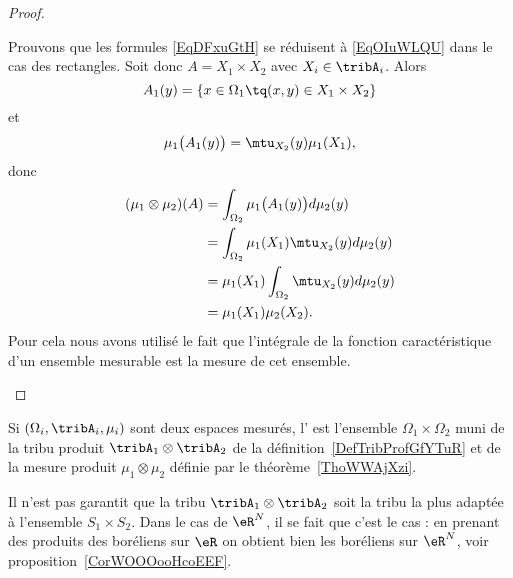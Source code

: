 \begin{proof}
\begin{subproof}
		Prouvons que les formules \eqref{EqDFxuGtH} se réduisent à \eqref{EqOIuWLQU} dans le cas des rectangles. Soit donc \( A=X_1\times X_2\) avec \( X_i\in\tribA_i\). Alors
		\begin{equation}
			A_1(y)=\{ x\in\Omega_1\tq (x,y)\in X_1\times X_2 \}
		\end{equation}
		et
		\begin{equation}
			\mu_1\big( A_1(y) \big)=\mtu_{X_2}(y)\mu_1(X_1),
		\end{equation}
		donc
		\begin{subequations}
			\begin{align}
				(\mu_1\otimes\mu_2)(A) & =\int_{\Omega_2}\mu_1\big( A_1(y) \big)d\mu_2(y) \\
				                       & =\int_{\Omega_2}\mu_1(X_1)\mtu_{X_2}(y)d\mu_2(y) \\
				                       & =\mu_1(X_1)\int_{\Omega_2}\mtu_{X_2}(y)d\mu_2(y) \\
				                       & =\mu_1(X_1)\mu_2(X_2).
			\end{align}
		\end{subequations}
		Pour cela nous avons utilisé le fait que l'intégrale de la fonction caractéristique d'un ensemble mesurable est la mesure de cet ensemble.
	\end{subproof}
\end{proof}

\begin{definition}  \label{DefUMlBCAO}
	Si \( (\Omega_i,\tribA_i,\mu_i)\) sont deux espaces mesurés, l' est l'ensemble \( \Omega_1\times \Omega_2\) muni de la tribu produit \( \tribA_1\otimes \tribA_2\) de la définition~\ref{DefTribProfGfYTuR} et de la mesure produit \( \mu_1\otimes \mu_2\) définie par le théorème~\ref{ThoWWAjXzi}.
\end{definition}

\begin{remark}
	Il n'est pas garantit que la tribu \( \tribA_1\otimes\tribA_2\) soit la tribu la plus adaptée à l'ensemble \( S_1\times S_2\). Dans le cas de \( \eR^N\), il se fait que c'est le cas : en prenant des produits des boréliens sur \( \eR\) on obtient bien les boréliens sur \( \eR^N\), voir proposition~\ref{CorWOOOooHcoEEF}.
\end{remark}

